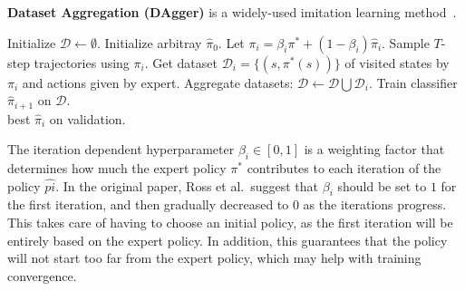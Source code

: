 \documentclass[12pt]{report}
\theoremstyle{definition}
\theoremstyle{remark}
\begin{document}
\textbf{Dataset Aggregation (DAgger)} is a widely-used imitation learning method~\cite{ross_reduction_2011}.
\begin{algorithm}
    \caption{\textsc{DAgger} Algorithm, with expert policy $\pi^*$, $N$ iterations, and trajectory length $T$. Adapted from~\cite{ross_reduction_2011}.}\label{alg:dagger}
    \begin{algorithmic}[1]
        \State Initialize $\mathcal{D} \leftarrow \emptyset$.
        \State Initialize arbitray $\hat{\pi}_0$.
        \State Let $\pi_i = \beta_i \pi^* + (1-\beta_i) \hat{\pi}_{i}$.
        \State Sample $T$-step trajectories using $\pi_i$.
        \State Get dataset $\mathcal{D}_i = \{ (s, \pi^*(s)) \}$ of visited states by $\pi_i$ and actions given by expert.
        \State Aggregate datasets: $\mathcal{D} \leftarrow \mathcal{D} \bigcup \mathcal{D}_i$.
        \State Train classifier $\hat{\pi}_{i+1}$ on $\mathcal{D}$.
        \EndFor \\
        \Return best $\hat{\pi}_i$ on validation.
    \end{algorithmic}
\end{algorithm}

The iteration dependent hyperparameter $\beta_i \in [0, 1]$ is a weighting factor that determines how much the expert policy $\pi^*$ contributes to each iteration of the policy $\hat{pi}$. In the original paper, Ross et al.\ suggest that $\beta_i$ should be set to $1$ for the first iteration, and then gradually decreased to $0$ as the iterations progress. This takes care of having to choose an initial policy, as the first iteration will be entirely based on the expert policy. In addition, this guarantees that the policy will not start too far from the expert policy, which may help with training convergence.



\end{document}
